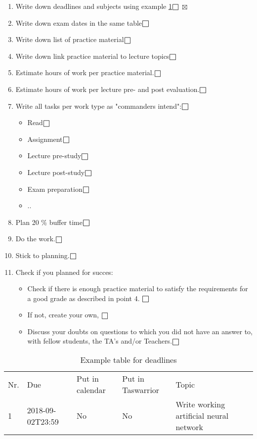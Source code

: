 \begin{enumerate}
    \item Write down deadlines and subjects using example  \cref{tab:example_table}$\msquare$ $\boxtimes$
    \item Write down exam dates in the same table$\msquare$
    \item Write down list of practice material$\msquare$
    \item Write down link practice material to lecture topics$\msquare$
    \item Estimate hours of work per practice material.$\msquare$
    \item Estimate hours of work per lecture pre- and post evaluation.$\msquare$
    \item Write all tasks per work type as "commanders intend"\cite{made_to_stick}:$\msquare$
        \begin{itemize}
            \item Read$\msquare$
            \item Assignment$\msquare$
            \item Lecture pre-study$\msquare$
            \item Lecture post-study$\msquare$
            \item Exam preparation$\msquare$
            \item ..
        \end{itemize}
    \item Plan 20 \% buffer time$\msquare$
    \item Do the work.$\msquare$
    \item Stick to planning.$\msquare$
    \item Check if you planned for succes:
    \begin{itemize}
        \item Check if there is enough practice material to satisfy the requirements for a good grade as described in point 4. $\msquare$ 
        \item If not, create your own, $\msquare$
        \item Discuss your doubts on questions to which you did not have an answer to, with fellow students, the TA's and/or Teachers.$\msquare$%
    \end{itemize}
\end{enumerate}
\begin{table}[H]
\caption{Example table for deadlines}
\begin{tabular}{|l|l|l|l|l|l}
\cline{1-5}
Nr. & Due              & Put in calendar & Put in Taswarrior & Topic                                                                                                   &  \\ \cline{1-5}
1   & 2018-09-02T23:59 & No              & No                & Write working artificial neural network                                                                 &  \\ \cline{1-5}
\end{tabular}
\label{tab:example_table}
\end{table}